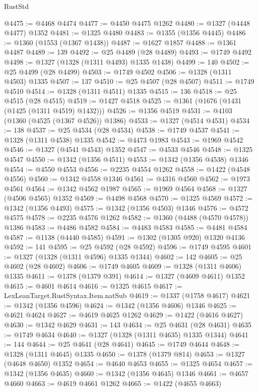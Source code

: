 \begin{lexlean}{RustStd}
\begin{coremodule}
@4475 := @4468 @4474
@4477 := @4450 @4475 @1262
@4480 := @1327 (@4448 @4477) @1352
@4481 := @1325 @4480
@4483 := @1355 (@1356 @4445)
@4486 := @1360 (@1553 (@1367 @1438))
@4487 := @1627 @1857
@4488 := @1361 @4487
@4489 := 139
@4492 := @25 @4489 (@28 @4489)
@4493 := @1749 @4492
@4498 := @1327 (@1328 (@1311 @4493) @1335 @1438)
@4499 := 140
@4502 := @25 @4499 (@28 @4499)
@4503 := @1749 @4502
@4506 := @1328 (@1311 @4503) @1335
@4507 := 137
@4510 := @25 @4507 (@28 @4507)
@4511 := @1749 @4510
@4514 := @1328 (@1311 @4511) @1335
@4515 := 136
@4518 := @25 @4515 (@28 @4515)
@4519 := @1427 @4518
@4525 := @1361 (@1676 (@1431 (@1425 (@1311 @4519) @1432)))
@4526 := @1356 @4519
@4531 := @4103 (@1360 (@4525 (@1367 @4526)) @1386)
@4533 := @1327 (@4514 @4531)
@4534 := 138
@4537 := @25 @4534 (@28 @4534)
@4538 := @1749 @4537
@4541 := @1328 (@1311 @4538) @1335
@4542 := @4473 @1983
@4543 := @1969 @4542
@4546 := @1327 (@4541 @4543) @1352
@4547 := @4533 @4546
@4548 := @1325 @4547
@4550 := @1342 (@1356 @4511)
@4553 := @1342 (@1356 @4538) @1346
@4554 := @4550 @4553
@4556 := @2235 @4554 @1262
@4558 := @1422 (@4548 @4556)
@4560 := @1342 @4558 @1346
@4561 := @4316 @4560
@4562 := @1973 @4561
@4564 := @1342 @4562 @1987
@4565 := @1969 @4564
@4568 := @1327 (@4506 @4565) @1352
@4569 := @4498 @4568
@4570 := @1325 @4569
@4572 := @1342 (@1356 @4493)
@4575 := @1342 (@1356 @4503) @1346
@4576 := @4572 @4575
@4578 := @2235 @4576 @1262
@4582 := @1360 (@4488 (@4570 @4578)) @1386
@4583 := @4486 @4582
@4584 := @4483 @4583
@4585 := @4481 @4584
@4587 := @1138 (@4440 @4585)
@4591 := @1302 (@1305 @920) @1320 @4136
@4592 := 141
@4595 := @25 @4592 (@28 @4592)
@4596 := @1749 @4595
@4601 := @1327 (@1328 (@1311 @4596) @1335 @1344)
@4602 := 142
@4605 := @25 @4602 (@28 @4602)
@4606 := @1749 @4605
@4609 := @1328 (@1311 @4606) @1335
@4611 := @1378 (@1379 @391)
@4614 := @1327 (@4609 @4611) @1352
@4615 := @4601 @4614
@4616 := @1325 @4615
@4617 := LexLeanTarget.RustSyntax.Item.natSub
@4619 := @1337 (@1758 @4617)
@4621 := @1342 (@1356 @4596)
@4624 := @1342 (@1356 @4606) @1346
@4625 := @4621 @4624
@4627 := @4619 @4625 @1262
@4629 := @1422 (@4616 @4627)
@4630 := @1342 @4629
@4631 := 143
@4634 := @25 @4631 (@28 @4631)
@4635 := @1749 @4634
@4640 := @1327 (@1328 (@1311 @4635) @1335 @1344)
@4641 := 144
@4644 := @25 @4641 (@28 @4641)
@4645 := @1749 @4644
@4648 := @1328 (@1311 @4645) @1335
@4650 := @1378 (@1379 @814)
@4653 := @1327 (@4648 @4650) @1352
@4654 := @4640 @4653
@4655 := @1325 @4654
@4657 := @1342 (@1356 @4635)
@4660 := @1342 (@1356 @4645) @1346
@4661 := @4657 @4660
@4663 := @4619 @4661 @1262
@4665 := @1422 (@4655 @4663)

\end{coremodule}
\end{lexlean}
